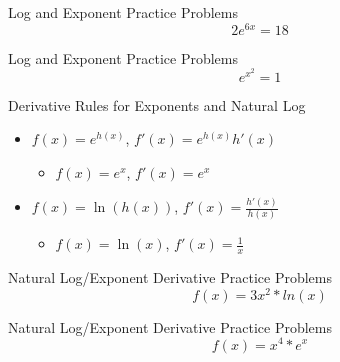 \documentclass[aspectratio=169]{beamer}
\begin{document}
\begin{frame}{Log and Exponent Practice Problems}\label{main1}
	\vspace{-4cm}
	\[
	2e^{6x} = 18
	\]
\end{frame}

\begin{frame}{Log and Exponent Practice Problems}\label{main1}
	\vspace{-4cm}
	\[
	e^{x^{2}} = 1
	\]
\end{frame}

\begin{frame}{Derivative Rules for Exponents and Natural Log}\label{main1}
\begin{itemize}
\begin{itemize}
    \item \(f(x) = e^{h(x)}\), \(f'(x) = e^{h(x)} h'(x)\)
    \begin{itemize}
		\item \(f(x) = e^x\), \(f'(x) = e^x\)
	\end{itemize}
    \item \(f(x) = \ln(h(x))\), \(f'(x) = \frac{h'(x)}{h(x)}\)
	\begin{itemize}
		\item \(f(x) = \ln(x)\), \(f'(x) = \frac{1}{x}\)
	\end{itemize}
\end{itemize}
\end{itemize}
\end{frame}

\begin{frame}{Natural Log/Exponent Derivative Practice Problems}\label{main1}
	\vspace{-4cm}
    \[
    f(x) = 3x^{2}*ln(x)
    \]
\end{frame}


\begin{frame}{Natural Log/Exponent Derivative Practice Problems}\label{main1}
	\vspace{-4cm}
    \[
    f(x) = x^{4}*e^{x}
    \]
\end{frame}
\end{document}
